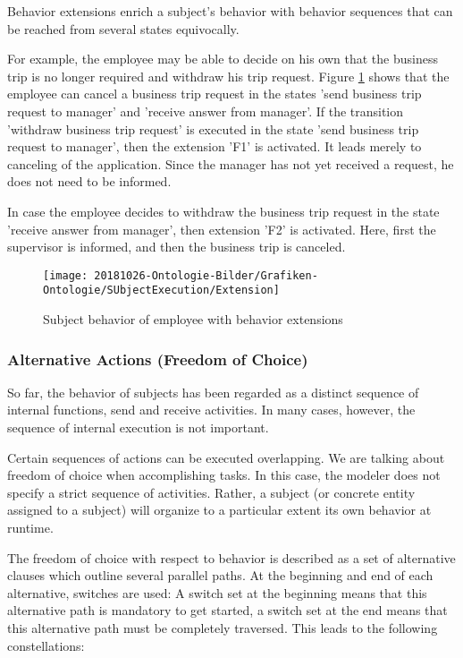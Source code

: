 Behavior extensions enrich a subject's behavior with behavior sequences that can be reached from several states equivocally.

For example, the employee may be able to decide on his own that the business trip is no longer required and withdraw his trip request. Figure \ref{fig:extension} shows that the employee can cancel a business trip request in the states 'send business trip request to manager' and 'receive answer from manager'. If the transition 'withdraw business trip request' is executed in the state 'send business trip request to manager', then the extension 'F1' is activated. It leads merely to canceling of the application. Since the manager has not yet received a request, he does not need to be informed.

In case the employee decides to withdraw the business trip request in the state 'receive answer from manager', then extension 'F2' is activated. Here, first the supervisor is informed, and then the business trip is canceled.

\begin{figure}[htbp]
	\centering
	\texttt{[image: 20181026-Ontologie-Bilder/Grafiken-Ontologie/SUbjectExecution/Extension]}
	\caption[Subject behavior of employee with behavior extensions]{Subject behavior of employee with behavior extensions}
	\label{fig:extension}
\end{figure}

\subsubsection{Alternative Actions (Freedom of Choice)} 

So far, the behavior of subjects has been regarded as a distinct sequence of internal functions, send and receive activities. In many cases, however, the sequence of internal execution is not important.

Certain sequences of actions can be executed overlapping. We are talking about freedom of choice when accomplishing tasks. In this case, the modeler does not specify a strict sequence of activities. Rather, a subject (or concrete entity assigned to a subject) will organize to a particular extent its own behavior at runtime.

The freedom of choice with respect to behavior is described as a set of alternative clauses which outline several parallel paths. At the beginning and end of each alternative, switches are used: A switch set at the beginning means that this alternative path is mandatory to get started, a switch set at the end means that this alternative path must be completely traversed. This leads to the following constellations:

